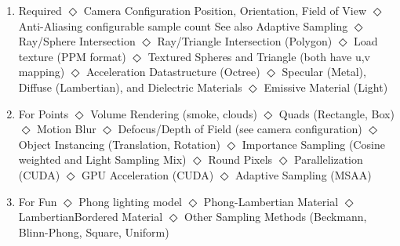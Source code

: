 \documentclass{article}
\def\sitem{\subitem $\Diamond$ }
\let\ssitem\subsubitem
\begin{document}
\begin{enumerate}[\quad]
    \item Required 
        \sitem Camera Configuration
            \ssitem Position, Orientation, Field of View
        \sitem Anti-Aliasing
            \ssitem configurable sample count 
            \ssitem See also Adaptive Sampling
        \sitem Ray/Sphere Intersection
        \sitem Ray/Triangle Intersection (Polygon)
        \sitem Load texture (PPM format)
        \sitem Textured Spheres and Triangle (both have u,v mapping)
        \sitem Acceleration Datastructure (Octree)
        \sitem Specular (Metal), Diffuse (Lambertian), and Dielectric Materials 
        \sitem Emissive Material (Light)
    \item For Points
        \sitem Volume Rendering (smoke, clouds)
        \sitem Quads (Rectangle, Box)
        \sitem Motion Blur 
        \sitem Defocus/Depth of Field (see camera configuration)
        \sitem Object Instancing (Translation, Rotation)
        \sitem Importance Sampling (Cosine weighted and Light Sampling Mix)
        \sitem Round Pixels 
        \sitem Parallelization (CUDA)
        \sitem GPU Acceleration (CUDA)
        \sitem Adaptive Sampling (MSAA)   
    \item For Fun
        \sitem Phong lighting model 
        \sitem Phong-Lambertian Material
        \sitem LambertianBordered Material
        \sitem Other Sampling Methods (Beckmann, Blinn-Phong, Square, Uniform)   

\end{enumerate}
\end{document}
